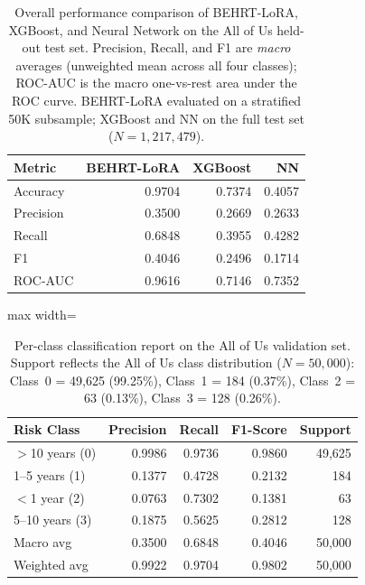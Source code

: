 \documentclass{article}
\begin{document}
\begin{table}
\caption{Overall performance comparison of BEHRT-LoRA, XGBoost, and Neural Network 
on the All of Us held-out test set. 
Precision, Recall, and F1 are \textit{macro} averages (unweighted mean across all four classes); 
ROC-AUC is the macro one-vs-rest area under the ROC curve. 
BEHRT-LoRA evaluated on a stratified 50K subsample; XGBoost and NN on the full test set ($N=1{,}217{,}479$).}
\label{tab:aou_overall_comparison}
\begin{tabular}{lrrr}
\toprule
Metric & BEHRT-LoRA & XGBoost & NN \\
\midrule
Accuracy  & 0.9704 & 0.7374 & 0.4057 \\
Precision & 0.3500 & 0.2669 & 0.2633 \\
Recall    & 0.6848 & 0.3955 & 0.4282 \\
F1        & 0.4046 & 0.2496 & 0.1714 \\
ROC-AUC   & 0.9616 & 0.7146 & 0.7352 \\
\bottomrule
\end{tabular}
\end{table}

\begin{table}[h]
\caption{Per-class classification report on the All of Us validation set. Support reflects the All of Us class distribution ($N=50{,}000$): Class~0 = 49{,}625 (99.25\%), Class~1 = 184 (0.37\%), Class~2 = 63 (0.13\%), Class~3 = 128 (0.26\%).}
\label{tab:aou_classification_report}
\begin{adjustbox}{max width=\textwidth}
\begin{tabular}{lrrrr}
\toprule
Risk Class & Precision & Recall & F1-Score & Support \\
\midrule
$>$10 years (0) & 0.9986 & 0.9736 & 0.9860 & 49{,}625 \\
1--5 years (1)  & 0.1377 & 0.4728 & 0.2132 &    184   \\
$<$1 year (2)   & 0.0763 & 0.7302 & 0.1381 &     63   \\
5--10 years (3) & 0.1875 & 0.5625 & 0.2812 &    128   \\
\midrule
Macro avg    & 0.3500 & 0.6848 & 0.4046 & 50{,}000 \\
Weighted avg & 0.9922 & 0.9704 & 0.9802 & 50{,}000 \\
\bottomrule
\end{tabular}
\end{adjustbox}
\end{table}
\end{document}
